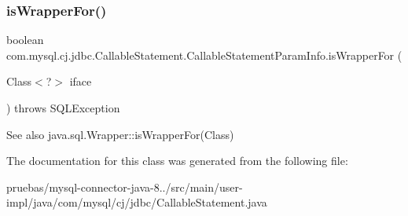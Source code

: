 \subsubsection{\texorpdfstring{is\+Wrapper\+For()}{isWrapperFor()}}
{\footnotesize\ttfamily boolean com.\+mysql.\+cj.\+jdbc.\+Callable\+Statement.\+Callable\+Statement\+Param\+Info.\+is\+Wrapper\+For (\begin{DoxyParamCaption}\item[{Class$<$?$>$}]{iface }\end{DoxyParamCaption}) throws S\+Q\+L\+Exception}

\begin{DoxySeeAlso}{See also}
java.\+sql.\+Wrapper\+::is\+Wrapper\+For(\+Class) 
\end{DoxySeeAlso}


The documentation for this class was generated from the following file\+:\begin{DoxyCompactItemize}
\item 
pruebas/mysql-\/connector-\/java-\/8../src/main/user-\/impl/java/com/mysql/cj/jdbc/Callable\+Statement.\+java\end{DoxyCompactItemize}
